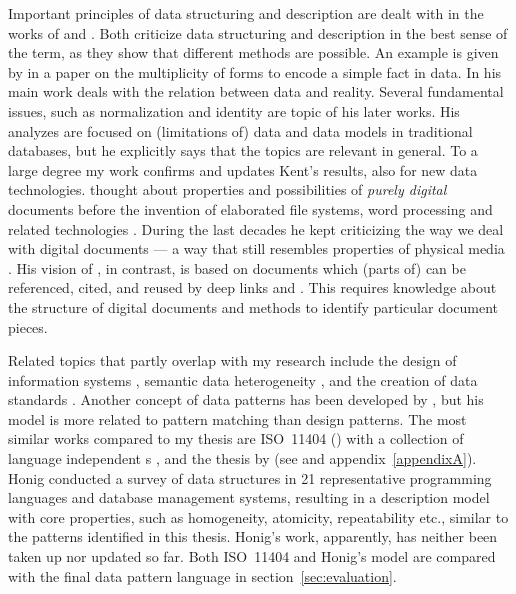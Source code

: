 Important principles of data structuring and description are dealt with in the
works of  and . Both criticize data
structuring and description in the best sense of the term, as they show that
different methods are possible. An example is given by \textcite{Kent1988} in a
paper on the multiplicity of forms to encode a simple fact in data. In his main
work \textcite{Kent1978} deals with the relation between data and reality.
Several fundamental issues, such as normalization and identity
\cite{Kent1983,Kent2003} are topic of his later works. His analyzes are focused
on (limitations of) data and data models in traditional databases, but he
explicitly says that the topics are relevant in general. To a large degree my
work confirms and updates Kent's results, also for new data technologies.
 thought about properties and possibilities of \emph{purely
digital} documents before the invention of elaborated file systems, word
processing and related technologies \cite{Nelson1965}. During the last decades
he kept criticizing the way we deal with digital documents --- a way that still
resembles properties of physical media \cite{Nelson1981,Nelson1986}. His vision
of , in contrast, is based on documents which (parts of) can be
referenced, cited, and reused by deep links and 
\cite{Nelson1999}.  This requires knowledge about the structure of digital
documents and methods to identify particular document pieces.




Related topics that partly overlap with my research include the design of
information systems \cite{Hirschheim1995}, semantic data heterogeneity
\cite{Sheth2005,Bergman2006,Pluempitiwiriyawej2000,Hayes2008}, and the creation
of data standards \cite{Meek1995,Stamper2000}. Another concept of data patterns
has been developed by \cite{Jay1995,Jay2009}, but his model is more related to
pattern matching than design patterns. The most similar works compared to my
thesis are ISO~11404 (\citeyear{ISO11404}) with a collection of language
independent s \cite{Meek1994a}, and the thesis by
\textcite{Honig1975} (see \textcite{Honig1978} and appendix~\ref{appendixA}).
Honig conducted a survey of data structures in 21 representative programming
languages and database management systems, resulting in a description model
with core properties, such as homogeneity, atomicity, repeatability etc.,
similar to the patterns identified in this thesis. Honig's work, apparently, has
neither been taken up nor updated so far. Both ISO~11404 and Honig's model are
compared with the final data pattern language in section~\ref{sec:evaluation}.


